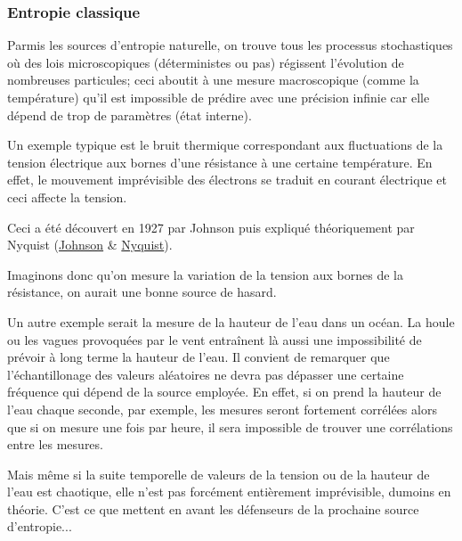 \documentclass{scrartcl}
\begin{document}
\subsubsection{Entropie classique}
Parmis les sources d’entropie naturelle, on trouve tous les processus stochastiques où des lois microscopiques (déterministes ou pas) régissent l'évolution de nombreuses particules; ceci aboutit à une mesure macroscopique (comme la température) qu’il est impossible de prédire avec une précision infinie car elle dépend de trop de paramètres (état interne). \par
Un exemple typique est le bruit thermique correspondant aux fluctuations de la tension électrique aux bornes d’une résistance à une certaine température. En effet, le mouvement imprévisible des électrons se traduit en courant électrique et ceci affecte la tension. \par
Ceci a été découvert en 1927 par Johnson puis expliqué théoriquement par Nyquist (\href{https://journals.aps.org/pr/abstract/10.1103/PhysRev.32.97}{Johnson} \& \href{https://journals.aps.org/pr/abstract/10.1103/PhysRev.32.110}{Nyquist}). \par
Imaginons donc qu’on mesure la variation de la tension aux bornes de la résistance, on aurait une bonne source de hasard. \par
Un autre exemple serait la mesure de la hauteur de l'eau dans un océan. La houle ou les vagues provoquées par le vent entraînent là aussi une impossibilité de prévoir à long terme la hauteur de l'eau. Il convient de remarquer que l'échantillonage des valeurs aléatoires ne devra pas dépasser une certaine fréquence qui dépend de la source employée. En effet, si on prend la hauteur de l'eau chaque seconde, par exemple, les mesures seront fortement corrélées alors que si on mesure une fois par heure, il sera impossible de trouver une corrélations entre les mesures.\par
Mais même si la suite temporelle de valeurs de la tension ou de la hauteur de l'eau est chaotique, elle n'est pas forcément entièrement imprévisible, dumoins en théorie. C'est ce que mettent en avant les défenseurs de la prochaine source d'entropie...
\end{document}
